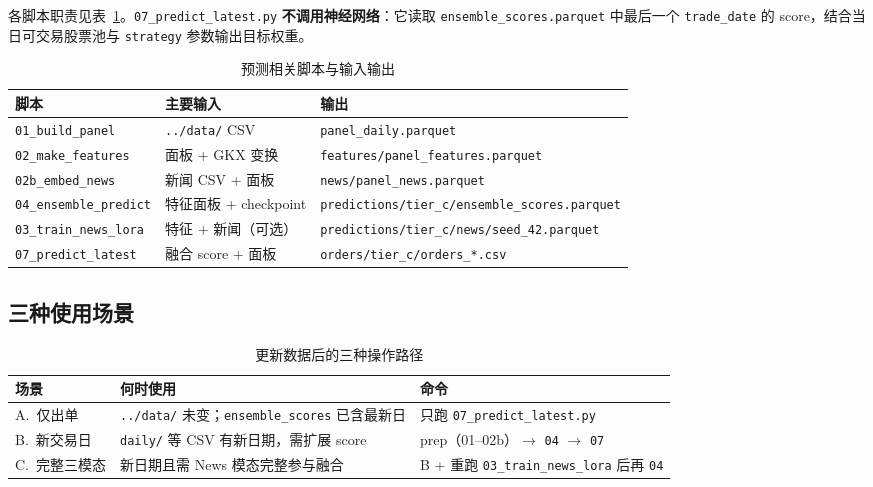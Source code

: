 \documentclass[UTF8,a4paper,12pt]{ctexart}
\begin{document}
各脚本职责见表~\ref{tab:predict-scripts}。\texttt{07\_predict\_latest.py} \textbf{不调用神经网络}：它读取 \texttt{ensemble\_scores.parquet} 中最后一个 \texttt{trade\_date} 的 score，结合当日可交易股票池与 \texttt{strategy} 参数输出目标权重。

\begin{table}[H]
\centering
\caption{预测相关脚本与输入输出}
\label{tab:predict-scripts}
\begin{tabular}{llp{5.2cm}}
\toprule
\textbf{脚本} & \textbf{主要输入} & \textbf{输出} \\
\midrule
\texttt{01\_build\_panel} & \texttt{../data/} CSV & \texttt{panel\_daily.parquet} \\
\texttt{02\_make\_features} & 面板 + GKX 变换 & \texttt{features/panel\_features.parquet} \\
\texttt{02b\_embed\_news} & 新闻 CSV + 面板 & \texttt{news/panel\_news.parquet} \\
\texttt{04\_ensemble\_predict} & 特征面板 + checkpoint & \texttt{predictions/tier\_c/ensemble\_scores.parquet} \\
\texttt{03\_train\_news\_lora} & 特征 + 新闻（可选） & \texttt{predictions/tier\_c/news/seed\_42.parquet} \\
\texttt{07\_predict\_latest} & 融合 score + 面板 & \texttt{orders/tier\_c/orders\_*.csv} \\
\bottomrule
\end{tabular}
\end{table}

\subsection{三种使用场景}

\begin{table}[H]
\centering
\caption{更新数据后的三种操作路径}
\label{tab:predict-scenarios}
\begin{tabular}{p{3.2cm}p{4.2cm}p{5.8cm}}
\toprule
\textbf{场景} & \textbf{何时使用} & \textbf{命令} \\
\midrule
A.\ 仅出单 & \texttt{../data/} 未变；\texttt{ensemble\_scores} 已含最新日 & 只跑 \texttt{07\_predict\_latest.py} \\
B.\ 新交易日 & \texttt{daily/} 等 CSV 有新日期，需扩展 score & prep（01--02b）$\to$ \texttt{04} $\to$ \texttt{07} \\
C.\ 完整三模态 & 新日期且需 News 模态完整参与融合 & B + 重跑 \texttt{03\_train\_news\_lora} 后再 \texttt{04} \\
\bottomrule
\end{tabular}
\end{table}
\end{document}
